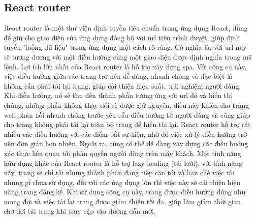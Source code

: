 \documentclass[./../main.tex]{subfiles}
\begin{document}
\subsection{React router}
React router \cite{reactrouter} là một thư viện định tuyến tiêu chuẩn trong ứng dụng React, dùng để giữ cho giao diện của ứng dụng đồng bộ với \acrshort{url} trên trình duyệt, giúp định tuyến "luồng dữ liệu" trong ứng dụng một cách rõ ràng. Có nghĩa là, với \acrshort{url} này sẽ tương đương với một điều hướng cùng một giao diện được định nghĩa trong mã lệnh. Lợi ích lớn nhất của React router là hỗ trợ xây dựng \acrfull{spa}. Với công cụ này, việc điều hướng giữa các trang trở nên dễ dàng, nhanh chóng và đặc biệt là không cần phải tải lại trang, giúp cải thiện hiệu suất, trải nghiệm người dùng. Khi điều hướng, nó sẽ tìm đến thành phần tương ứng với \acrshort{url} đó và hiển thị chúng, những phần không thay đổi sẽ được giữ nguyên, điều này khiến cho trang web phản hồi nhanh chóng trước yêu cầu điều hướng từ người dùng và cũng giúp cho trang không phải tải lại toàn bộ trang để hiển thị lại. React router hỗ trợ rất nhiều các điều hướng với các điểm bắt sự kiện, nhờ đó việc xử lý điều hướng trở nên đơn giản hơn nhiều. Ngoài ra, cũng có thể dễ dàng xây dựng các điều hướng xác thực liên quan tới phân quyền người dùng trên máy khách. Một tính năng hữu dụng khác của React router là hỗ trợ lazy loading (tải lười), với tính năng này, trang sẽ chỉ tải những thành phần đang tiếp cận tới và hạn chế việc tải những gì chưa sử dụng, đối với các ứng dụng lớn thì việc này sẽ cải thiện hiệu năng trang đáng kể. Khi sử dụng công cụ này, trang được điều hướng đúng như mong đợi và việc tải lại trang được giảm thiểu tối đa, giúp làm giảm thời gian chờ đợi tải trang khi truy cập vào đường dẫn mới.
\end{document}
